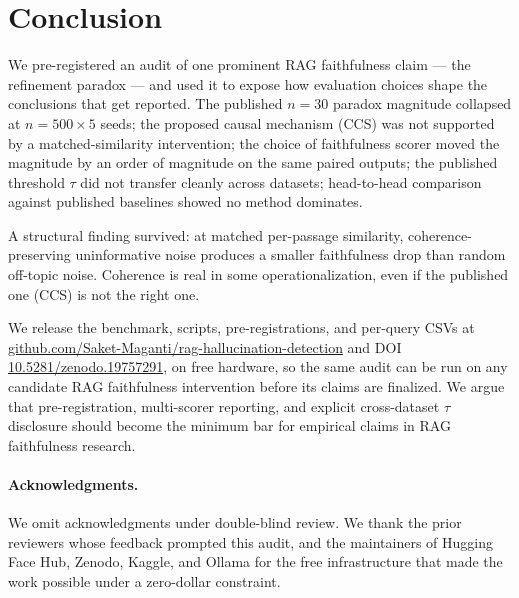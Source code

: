 \section{Conclusion}
\label{sec:conclusion}

We pre-registered an audit of one prominent RAG faithfulness claim
--- the refinement paradox --- and used it to expose how
evaluation choices shape the conclusions that get reported. The
published $n{=}30$ paradox magnitude collapsed at $n{=}500 \times 5$
seeds; the proposed causal mechanism (CCS) was not supported by a
matched-similarity intervention; the choice of faithfulness scorer
moved the magnitude by an order of magnitude on the same paired
outputs; the published threshold $\tau$ did not transfer cleanly
across datasets; head-to-head comparison against published
baselines showed no method dominates.

A structural finding survived: at matched per-passage similarity,
coherence-preserving uninformative noise produces a smaller
faithfulness drop than random off-topic noise. Coherence is real
in some operationalization, even if the published one (CCS) is
not the right one.

We release the benchmark, scripts, pre-registrations, and
per-query CSVs at
\href{https://github.com/Saket-Maganti/rag-hallucination-detection}{github.com/Saket-Maganti/rag-hallucination-detection}
and DOI \href{https://doi.org/10.5281/zenodo.19757291}{10.5281/zenodo.19757291},
on free hardware, so the same audit can be run on any candidate
RAG faithfulness intervention before its claims are finalized.
We argue that pre-registration, multi-scorer reporting, and
explicit cross-dataset $\tau$ disclosure should become the minimum
bar for empirical claims in RAG faithfulness research.

\paragraph{Acknowledgments.}
\ifanonymous
We omit acknowledgments under double-blind review.
\else
We thank the prior reviewers whose feedback prompted this audit,
and the maintainers of Hugging Face Hub, Zenodo, Kaggle, and
Ollama for the free infrastructure that made the work possible
under a zero-dollar constraint.
\fi
